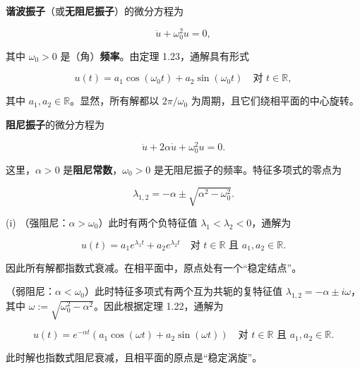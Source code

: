 \begin{example}
\begin{items}
\textbf{谐波振子}（或\textbf{无阻尼振子}）的微分方程为

\[
\ddot{u} + \omega_{0}^{2}u = 0 ,
\]

其中 $ \omega_{0} > 0 $ 是（角）\textbf{频率}。由定理 1.23，通解具有形式

\[
u(t) = a_{1}\cos(\omega_{0}t) + a_{2}\sin(\omega_{0}t) \quad \text{对 } t \in \mathbb{R} ,
\]

其中 $ a_{1}, a_{2} \in \mathbb{R} $。显然，所有解都以 $ 2\pi/\omega_{0} $ 为周期，且它们绕相平面的中心旋转。

\end{items}


\begin{items}
\item[（d）]

\textbf{阻尼振子}的微分方程为

\[
\ddot{u} + 2\alpha\dot{u} + \omega_{0}^{2}u = 0 .
\]

这里，$ \alpha > 0 $ 是\textbf{阻尼常数}，$ \omega_{0} > 0 $ 是无阻尼振子的频率。特征多项式的零点为

\[
\lambda_{1,2} = -\alpha \pm \sqrt{\alpha^{2} - \omega_{0}^{2}} .
\]
\end{items}

(i) （强阻尼：$ \alpha > \omega_{0} $）此时有两个负特征值 $ \lambda_{1} < \lambda_{2} < 0 $，通解为

\[
u(t) = a_{1}e^{\lambda_{1}t} + a_{2}e^{\lambda_{2}t} \quad \text{对 } t \in \mathbb{R} \text{ 且 } a_{1}, a_{2} \in \mathbb{R} .
\]

因此所有解都指数式衰减。在相平面中，原点处有一个“稳定结点”。


\begin{subitems}
\item[（ii）]

（弱阻尼：$ \alpha < \omega_{0} $）此时特征多项式有两个互为共轭的复特征值 $ \lambda_{1,2} = -\alpha \pm i\omega $，其中 $ \omega := \sqrt{\omega_{0}^{2} - \alpha^{2}} $。因此根据定理 1.22，通解为

\[
u(t) = e^{-\alpha t}\left( a_{1}\cos(\omega t) + a_{2}\sin(\omega t) \right) \quad \text{对 } t \in \mathbb{R} \text{ 且 } a_{1}, a_{2} \in \mathbb{R} .
\]

此时解也指数式阻尼衰减，且相平面的原点是“稳定涡旋”。

\end{subitems}


\end{example}
